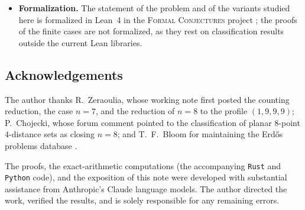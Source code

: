 \documentclass[11pt]{article}
\theoremstyle{definition}
\theoremstyle{remark}
\begin{document}
\begin{itemize}
sets with $\lfloor n/4 \rfloor$ distances each of multiplicity $> n$; the failure profile
of Table \ref{tab:profiles} would require about $n/2 - 1$ such rich classes, twice what is
known to be constructible --- consistent with, but far from proving, the conjecture.
\item \textbf{Formalization.} The statement of the problem and of the variants studied
here is formalized in Lean~4 in the \textsc{Formal Conjectures} project
\cite{FormalConjectures}; the proofs of the finite cases are not formalized, as they rest
on classification results outside the current Lean libraries.
\end{itemize}

\subsection*{Acknowledgements}
The author thanks R.\ Zeraoulia, whose working note \cite{Zeraoulia26} first posted the
counting reduction, the case $n = 7$, and the reduction of $n = 8$ to the profile
$(1,9,9,9)$; P.\ Chojecki, whose forum comment \cite{Chojecki26} pointed to the
classification of planar $8$-point $4$-distance sets as closing $n = 8$; and T.\ F.\ Bloom
for maintaining the Erd\H{o}s problems database \cite{Bloom132}.

The proofs, the exact-arithmetic computations (the accompanying \texttt{Rust} and
\texttt{Python} code), and the exposition of this note were developed with substantial
assistance from Anthropic's Claude language models. The author directed the work, verified
the results, and is solely responsible for any remaining errors.



\end{document}
